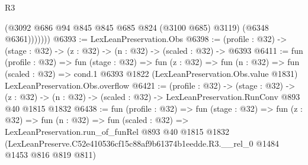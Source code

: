 \begin{lexlean}{R3}
\begin{coremodule}
                (@3092 @686 @94 @845 @845 @685 @824 (@3100 @685) @3119)
                (@6348 @6361)))))))
@6393 := LexLeanPreservation.Obs
@6398 := (profile : @32) -> (stage : @32) -> (z : @32) -> (n : @32) -> (scaled : @32) -> @6393
@6411 := fun (profile : @32) =>
  fun (stage : @32) =>
  fun (z : @32) =>
  fun (n : @32) =>
  fun (scaled : @32) =>
  cond.{1} @6393 @1822 (LexLeanPreservation.Obs.value @1831) LexLeanPreservation.Obs.overflow
@6421 := (profile : @32) ->
  (stage : @32) ->
  (z : @32) -> (n : @32) -> (scaled : @32) -> LexLeanPreservation.RunConv @893 @40 @1815 @1832
@6438 := fun (profile : @32) =>
  fun (stage : @32) =>
  fun (z : @32) =>
  fun (n : @32) =>
  fun (scaled : @32) =>
  LexLeanPreservation.run_of_funRel
    @893
    @40
    @1815
    @1832
    (LexLeanPreserve.C52e410536cf15c88af9b61374b1eedde.R3.__rel_0 @1484 @1453 @816 @819 @811)
\end{coremodule}
\end{lexlean}
